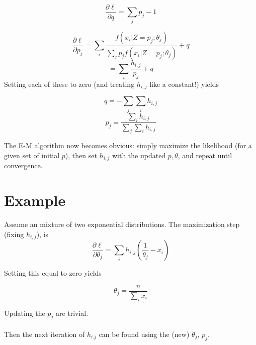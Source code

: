 \documentclass{article}
\begin{document}
\[\frac{\partial \ell}{\partial q}=\sum_j p_j-1\]

\[\frac{\partial \ell}{\partial p_j}=\sum_i \frac{f(x_i|Z=p_j; \theta_j)}{\sum_j p_j f(x_i|Z=p_j; \theta_j)}+q \]
\[=\sum_i \frac{h_{i,j}}{p_j}+q \]
Setting each of these to zero (and treating \(h_{i,j}\) like a constant!) yields

\[q=-\sum_j \sum_i h_{i,j}\]
\[p_j=\frac{\sum_i h_{i, j}}{\sum_j \sum_i h_{i, j}}\]

The E-M algorithm now becomes obvious: simply maximize the likelihood (for a given set of initial \(p\)), then set \(h_{i,j}\) with the updated \(p,\theta\), and repeat until convergence.

\section{Example}

Assume an mixture of two exponential distributions.  The maximization step (fixing \(h_{i,j}\)), is 
\[\frac{\partial \ell}{\partial \theta_j}=\sum_i h_{i,j} \left(\frac{1}{\theta_j}-x_i\right)\]

Setting this equal to zero yields 

\[\theta_j=\frac{n}{\sum_i x_i}\]

Updating the \(p_j\) are trivial.
\\
\\
Then the next iteration of \(h_{i.j}\) can be found using the (new) \(\theta_j\), \(p_j\).
\end{document}
